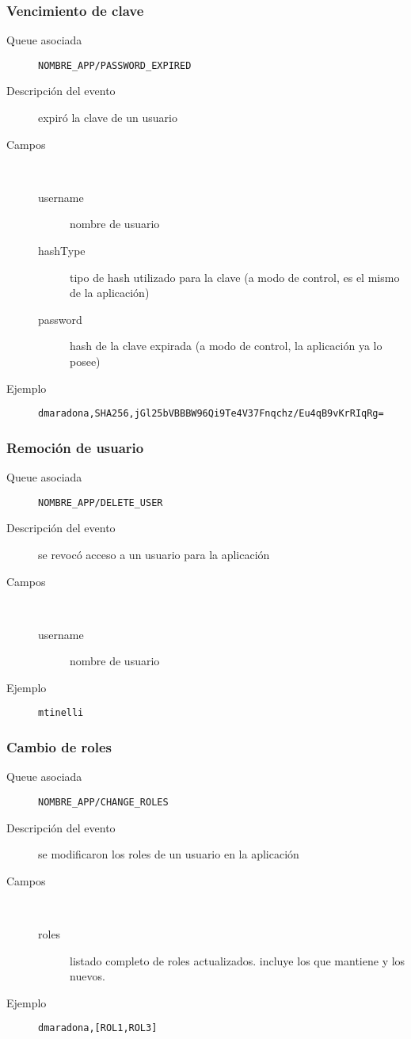 \subsubsection{Vencimiento de clave}
\begin{description}
  \item[Queue asociada] \texttt{NOMBRE\_APP/PASSWORD\_EXPIRED}
  \item[Descripción del evento] expiró la clave de un usuario
  \item[Campos] \ 
    \begin{description}
      \item[username] nombre de usuario
      \item[hashType] tipo de hash utilizado para la clave (a modo de control, es el mismo de la aplicación)
      \item[password] hash de la clave expirada (a modo de control, la aplicación ya lo posee)
    \end{description}
  \item[Ejemplo] \texttt{dmaradona,SHA256,jGl25bVBBBW96Qi9Te4V37Fnqchz/Eu4qB9vKrRIqRg=}
\end{description}


\subsubsection{Remoción de usuario}
\begin{description}
  \item[Queue asociada] \texttt{NOMBRE\_APP/DELETE\_USER}
  \item[Descripción del evento] se revocó acceso a un usuario para la aplicación
  \item[Campos] \ 
    \begin{description}
      \item[username] nombre de usuario
    \end{description}
  \item[Ejemplo] \texttt{mtinelli}
\end{description}

\subsubsection{Cambio de roles}
\begin{description}
  \item[Queue asociada] \texttt{NOMBRE\_APP/CHANGE\_ROLES}
  \item[Descripción del evento] se modificaron los roles de un usuario en la aplicación
  \item[Campos] \ 
    \begin{description}
      \item[roles] listado completo de roles actualizados. incluye los que mantiene y los nuevos.
    \end{description}
  \item[Ejemplo] \texttt{dmaradona,[ROL1,ROL3]}
\end{description}
